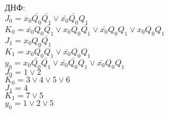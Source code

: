 \documentclass[a4paper,10pt]{article}
\begin{document}
        ДНФ: \\
        $J_0 = x_0 \bar{Q_0} \bar{Q_1} \lor \bar{x_0} \bar{Q_0} Q_1$ \\
        $K_0 = \bar{x_0} Q_0 \bar{Q_1} \lor x_0 Q_0 \bar{Q_1} \lor \bar{x_0} Q_0 Q_1 \lor x_0 Q_0 Q_1$ \\
        $J_1 = x_0 Q_0 \bar{Q_1}$ \\
        $K_1 = x_0 \bar{Q_0} Q_1 \lor \bar{x_0} Q_0 Q_1$ \\ 
        $y_0 = x_0\bar{Q_0} \bar{Q_1}  \lor \bar{x_0}\bar{Q_0} Q_1  \lor \bar{x_0}Q_0 Q_1 $ \\
		$J_0 = 1 \lor 2$ \\
		$K_0 = 3 \lor 4 \lor 5 \lor 6$ \\
		$J_1 = 4 $\\
		$K_1 = 7 \lor 5$ \\
		$y_0 = 1 \lor 2 \lor 5$
\end{document}
